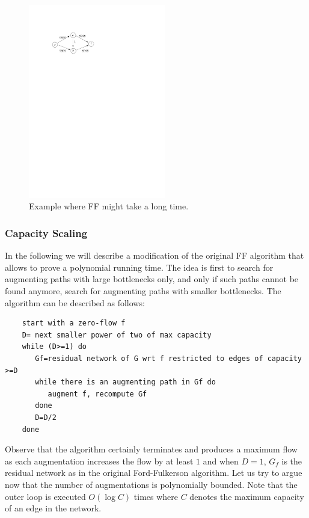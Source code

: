 \documentclass{article}
\begin{document}
\begin{figure}
\centering
\includegraphics[width=6cm]{Figs/FF-bad.pdf}
\caption{Example where FF might take a long time.}\label{FIG:FFbad}
\end{figure}

\subsubsection{Capacity Scaling}
In the following we will describe a modification of the original FF algorithm that allows to prove a polynomial running time. The idea is first to search for augmenting paths with large bottlenecks only, and only if such paths cannot be found anymore, search for augmenting paths with smaller bottlenecks. The algorithm can be described as follows:
\begin{verbatim}
	start with a zero-flow f
	D= next smaller power of two of max capacity
	while (D>=1) do
	   Gf=residual network of G wrt f restricted to edges of capacity >=D
	   while there is an augmenting path in Gf do
	      augment f, recompute Gf
	   done
	   D=D/2
	done
\end{verbatim}

Observe that the algorithm certainly terminates and produces a maximum flow as each augmentation increases the flow by at least $1$ and when $D=1$, $G_f$ is the residual network as in the original Ford-Fulkerson algorithm.
Let us try to argue now that the number of augmentations is polynomially bounded.
Note that the outer loop is executed $O(\log C)$ times where $C$ denotes the maximum capacity of an edge in the network.
\end{document}
